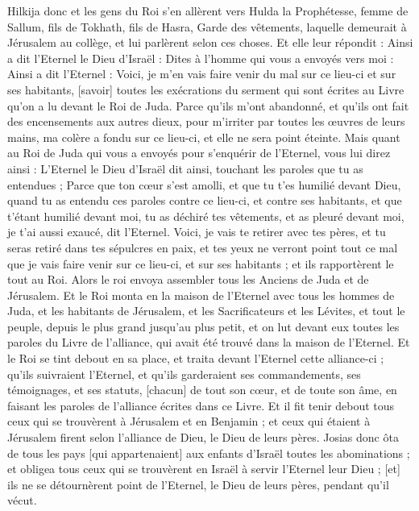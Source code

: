 \begin{multicols}{2}
Hilkija donc et les gens du Roi s'en allèrent vers Hulda la Prophétesse, femme de Sallum, fils de Tokhath, fils de Hasra, Garde des vêtements, laquelle demeurait à Jérusalem au collège, et lui parlèrent selon ces choses.
Et elle leur répondit : Ainsi a dit l'Eternel le Dieu d'Israël : Dites à l'homme qui vous a envoyés vers moi :
Ainsi a dit l'Eternel : Voici, je m'en vais faire venir du mal sur ce lieu-ci et sur ses habitants, [savoir] toutes les exécrations du serment qui sont écrites au Livre qu'on a lu devant le Roi de Juda.
Parce qu'ils m'ont abandonné, et qu'ils ont fait des encensements aux autres dieux, pour m'irriter par toutes les œuvres de leurs mains, ma colère a fondu sur ce lieu-ci, et elle ne sera point éteinte.
Mais quant au Roi de Juda qui vous a envoyés pour s'enquérir de l'Eternel, vous lui direz ainsi : L'Eternel le Dieu d'Israël dit ainsi, touchant les paroles que tu as entendues ;
Parce que ton cœur s'est amolli, et que tu t'es humilié devant Dieu, quand tu as entendu ces paroles contre ce lieu-ci, et contre ses habitants, et que t'étant humilié devant moi, tu as déchiré tes vêtements, et as pleuré devant moi, je t'ai aussi exaucé, dit l'Eternel.
Voici, je vais te retirer avec tes pères, et tu seras retiré dans tes sépulcres en paix, et tes yeux ne verront point tout ce mal que je vais faire venir sur ce lieu-ci, et sur ses habitants ; et ils rapportèrent le tout au Roi.
Alors le roi envoya assembler tous les Anciens de Juda et de Jérusalem.
Et le Roi monta en la maison de l'Eternel avec tous les hommes de Juda, et les habitants de Jérusalem, et les Sacrificateurs et les Lévites, et tout le peuple, depuis le plus grand jusqu'au plus petit, et on lut devant eux toutes les paroles du Livre de l'alliance, qui avait été trouvé dans la maison de l'Eternel.
Et le Roi se tint debout en sa place, et traita devant l'Eternel cette alliance-ci ; qu'ils suivraient l'Eternel, et qu'ils garderaient ses commandements, ses témoignages, et ses statuts, [chacun] de tout son cœur, et de toute son âme, en faisant les paroles de l'alliance écrites dans ce Livre.
Et il fit tenir debout tous ceux qui se trouvèrent à Jérusalem et en Benjamin ; et ceux qui étaient à Jérusalem firent selon l'alliance de Dieu, le Dieu de leurs pères.
Josias donc ôta de tous les pays [qui appartenaient] aux enfants d'Israël toutes les abominations ; et obligea tous ceux qui se trouvèrent en Israël à servir l'Eternel leur Dieu ; [et] ils ne se détournèrent point de l'Eternel, le Dieu de leurs pères, pendant qu'il vécut.

\end{multicols}
